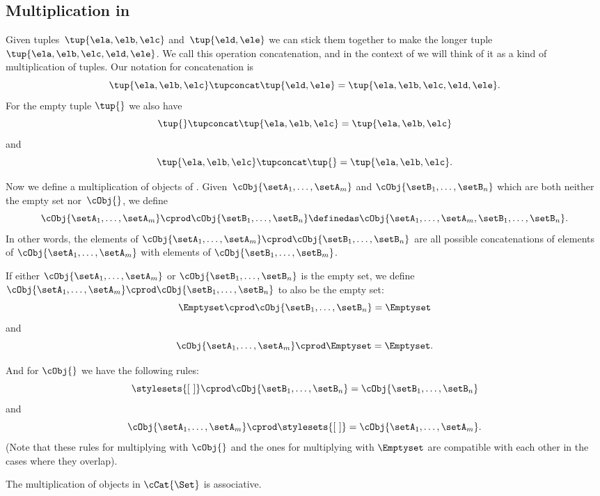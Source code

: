 \subsection{Multiplication in \cCat{\Set}}

Given tuples~$\tup{\ela, \elb, \elc}$ and~$\tup{\eld, \ele}$ we can stick them together to make the longer tuple~$\tup{\ela, \elb, \elc, \eld, \ele}$.
We call this operation concatenation, and in the context of \cCat{\Set} we will think of it as a kind of multiplication of tuples.
Our notation for concatenation is
\begin{equation*}
    \tup{\ela, \elb, \elc} \tupconcat \tup{\eld, \ele} = \tup{\ela, \elb, \elc, \eld, \ele}.
\end{equation*}
For the empty tuple $\tup{  }$ we also have
\begin{equation*}
    \tup{} \tupconcat \tup{\ela, \elb, \elc}  = \tup{\ela, \elb, \elc}
\end{equation*}
and
\begin{equation*}
    \tup{\ela, \elb, \elc}  \tupconcat \tup{ } = \tup{\ela, \elb, \elc}.
\end{equation*}

Now we define a multiplication of objects of \cCat{\Set}.
Given~$\cObj{\setA_1, \dots, \setA_m}$ and $\cObj{\setB_1,  \dots, \setB_n}$ which are both neither the empty set nor~$\cObj{}$, we define
\begin{equation}
    \cObj{\setA_1, \dots, \setA_m} \cprod \cObj{\setB_1, \dots, \setB_n} \definedas \cObj{\setA_1, \dots, \setA_m, \setB_1,  \dots, \setB_n}.
\end{equation}
In other words, the elements of $\cObj{\setA_1, \dots, \setA_m} \cprod \cObj{\setB_1, \dots, \setB_n}$ are all possible concatenations of elements of $\cObj{\setA_1, \dots, \setA_m}$ with elements of $\cObj{\setB_1, \dots, \setB_m}$.

If either $\cObj{\setA_1, \dots, \setA_m}$ or $\cObj{\setB_1, \dots, \setB_n}$ is the empty set, we define $\cObj{\setA_1, \dots, \setA_m} \cprod \cObj{\setB_1, \dots, \setB_n}$ to also be the empty set:
\begin{equation}
    \Emptyset \cprod \cObj{\setB_1, \dots, \setB_n} = \Emptyset
\end{equation}
and
\begin{equation}
    \cObj{\setA_1, \dots, \setA_m} \cprod \Emptyset = \Emptyset.
\end{equation}

And for $\cObj{}$ we have the following rules:
\begin{equation}
    \stylesets{[ \ ]} \cprod \cObj{\setB_1, \dots, \setB_n} = \cObj{\setB_1,  \dots, \setB_n}
\end{equation}
and
\begin{equation}
    \cObj{\setA_1, \dots, \setA_m} \cprod \stylesets{[ \ ]} = \cObj{\setA_1, \dots, \setA_m}.
\end{equation}
(Note that these rules for multiplying with $\cObj{}$ and the ones for multiplying with $\Emptyset$ are compatible with each other in the cases where they overlap).

\begin{remark}
    The multiplication of objects in $\cCat{\Set}$ is associative.
\end{remark}
